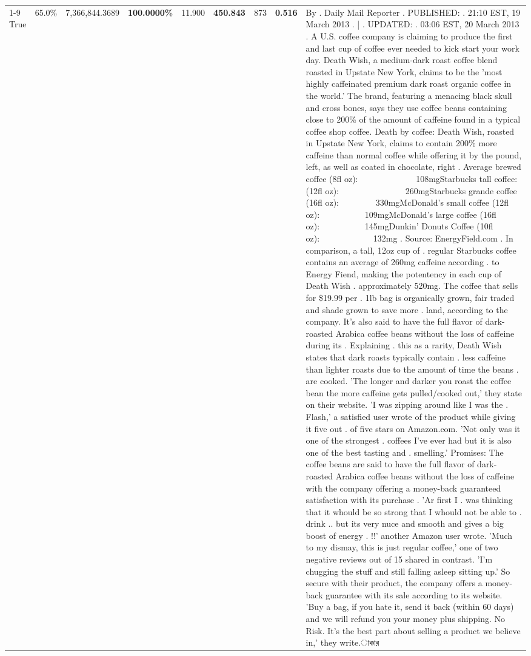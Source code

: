 \begin{table}[H]
{\begin{tabular}{lllrlllll}
\cline{1-9}
True & 65.0\% & 7,366,844.3689 & \bfseries \color{red} 100.0000\% & 11.900 & \bfseries \color{red} 450.843 & 873 & \bfseries \color{red} 0.516 & By . Daily Mail Reporter . PUBLISHED: . 21:10 EST, 19 March 2013 . | . UPDATED: . 03:06 EST, 20 March 2013 . A U.S. coffee company is claiming to produce the first and last cup of coffee ever needed to kick start your work day. Death Wish, a medium-dark roast coffee blend roasted in Upstate New York, claims to be the 'most highly caffeinated premium dark roast organic coffee in the world.' The brand, featuring a menacing black skull and cross bones, says they use coffee beans containing close to 200\% of the amount of caffeine found in a typical coffee shop coffee. Death by coffee: Death Wish, roasted in Upstate New York, claims to contain 200\% more caffeine than normal coffee while offering it by the pound, left, as well as coated in chocolate, right . Average brewed coffee (8fl oz):              108mgStarbucks tall coffee: (12fl oz):                260mgStarbucks grande coffee (16fl oz):         330mgMcDonald's small coffee (12fl oz):           109mgMcDonald's large coffee (16fl oz):           145mgDunkin' Donuts Coffee (10fl oz):             132mg . Source: EnergyField.com . In comparison, a tall, 12oz cup of . regular Starbucks coffee contains an average of 260mg caffeine according . to Energy Fiend, making the potentency in each cup of Death Wish . approximately 520mg. The coffee that sells for \$19.99 per . 1lb bag is organically grown, fair traded and shade grown to save more . land, according to the company. It's also said to have the full flavor of dark-roasted Arabica coffee beans without the loss of caffeine during its . Explaining . this as a rarity, Death Wish states that dark roasts typically contain . less caffeine than lighter roasts due to the amount of time the beans . are cooked. 'The longer and darker you roast the coffee bean the more caffeine gets pulled/cooked out,' they state on their website. 'I was zipping around like I was the . Flash,' a satisfied user wrote of the product while giving it five out . of five stars on Amazon.com. 'Not only was it one of the strongest . coffees I've ever had but it is also one of the best tasting and . smelling.’ Promises: The coffee beans are said to have the full flavor of dark-roasted Arabica coffee beans without the loss of caffeine with the company offering a money-back guaranteed satisfaction with its purchase . 'Ar first I . was thinking that it whould be so strong that I whould not be able to . drink .. but its very nuce and smooth and gives a big boost of energy . !!' another Amazon user wrote. 'Much to my dismay, this is just regular coffee,' one of two negative reviews out of 15 shared in contrast. 'I'm chugging the stuff and still falling asleep sitting up.' So secure with their product, the company offers a money-back guarantee with its sale according to its website. 'Buy a bag, if you hate it, send it back (within 60 days) and we will refund you your money plus shipping. No Risk. It’s the best part about selling a product we believe in,' they write.াকার \\

\end{tabular}}
\end{table}
